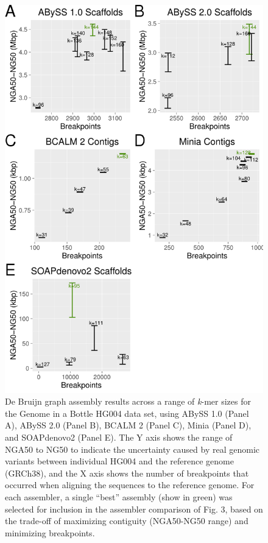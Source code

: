 \documentclass[
  12pt,
  oneside,
  openany]{book}
\begin{document}
\begin{appendices}
\begin{figure}
\hypertarget{fig:k}{%
\centering
\includegraphics{abyss2-appendix/k-sweeps.png}
\caption[De Bruijn graph assembly results across a range of \emph{k}-mer sizes for the Genome in a Bottle HG004 data set, using ABySS 1.0 (Panel A), ABySS 2.0 (Panel B), BCALM 2 (Panel C), Minia (Panel D), and SOAPdenovo2 (Panel E).]{\footnotesize De Bruijn graph assembly results across a range of \emph{k}-mer sizes for the Genome in a Bottle HG004 data set, using ABySS 1.0 (Panel A), ABySS 2.0 (Panel B), BCALM 2 (Panel C), Minia (Panel D), and SOAPdenovo2 (Panel E). The Y axis shows the range of NGA50 to NG50 to indicate the uncertainty caused by real genomic variants between individual HG004 and the reference genome (GRCh38), and the X axis shows the number of breakpoints that occurred when aligning the sequences to the reference genome. For each assembler, a single ``best'' assembly (show in green) was selected for inclusion in the assembler comparison of Fig. 3, based on the trade-off of maximizing contiguity (NGA50-NG50 range) and minimizing breakpoints.}\label{fig:k}
}
\end{figure}


\end{appendices}
\end{document}
